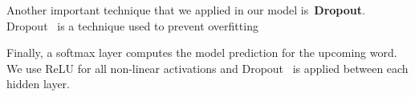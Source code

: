 Another important technique that we applied in our model is~\textbf{Dropout}. Dropout~\cite{hinton2012dropout} is a technique used to prevent overfitting 

Finally, a softmax layer computes the model prediction for the upcoming word. We use ReLU for all non-linear activations and Dropout~\cite{hinton2012dropout} is applied between each hidden layer.%








